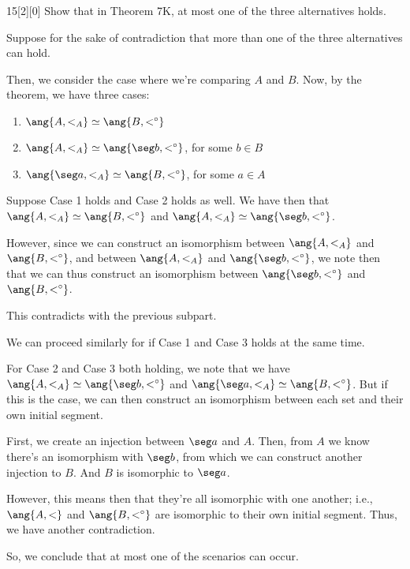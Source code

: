 \documentclass{article}
\begin{document}
\begin{hw}{15}[2][0]
	Show that in Theorem 7K, at most one of the three alternatives holds.
\end{hw}
\begin{solution}
	Suppose for the sake of contradiction that more than one of the three alternatives can hold.
	
	Then, we consider the case where we're comparing $A$ and $B$. Now, by the theorem, we have three cases:
	\begin{enumerate}
		\item $\ang{A, <_A} \simeq \ang{B, <^{\circ}}$
		\item $\ang{A, <_A} \simeq \ang{\seg b, <^{\circ}}$, for some $b \in B$
		\item $\ang{\seg a, <_A} \simeq \ang{B, <^{\circ}}$, for some $a \in A$
	\end{enumerate}

	Suppose Case 1 holds and Case 2 holds as well. We have then that $\ang{A, <_A} \simeq \ang{B, <^{\circ}}$ and $\ang{A, <_A} \simeq \ang{\seg b, <^{\circ}}$.
	
	However, since we can construct an isomorphism between $\ang{A, <_A}$ and $\ang{B, <^{\circ}}$, and between $\ang{A, <_A}$ and $\ang{\seg b, <^{\circ}}$, we note then that we can thus construct an isomorphism between $\ang{\seg b, <^{\circ}}$ and $\ang{B, <^{\circ}}$.
	
	This contradicts with the previous subpart.
	
	We can proceed similarly for if Case 1 and Case 3 holds at the same time.
	
	For Case 2 and Case 3 both holding, we note that we have $\ang{A, <_A} \simeq \ang{\seg b, <^{\circ}}$ and $\ang{\seg a, <_A} \simeq \ang{B, <^{\circ}}$. But if this is the case, we can then construct an isomorphism between each set and their own initial segment.
	
	First, we create an injection between $\seg a$ and $A$. Then, from $A$ we know there's an isomorphism with $\seg b$, from which we can construct another injection to $B$. And $B$ is isomorphic to $\seg a$.
	
	However, this means then that they're all isomorphic with one another; i.e., $\ang{A, <}$ and $\ang{B, <^{\circ}}$ are isomorphic to their own initial segment. Thus, we have another contradiction.
	
	So, we conclude that at most one of the scenarios can occur.
\end{solution}
\end{document}
